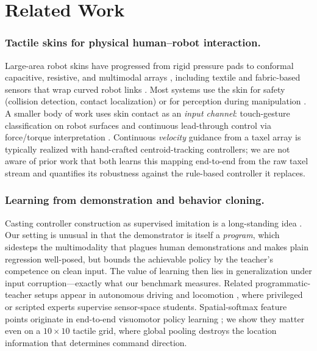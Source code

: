 \documentclass[runningheads]{llncs}
\begin{document}
\section{Related Work}
\label{sec:related}

\subsubsection{Tactile skins for physical human--robot interaction.}
Large-area robot skins have progressed from rigid pressure pads to
conformal capacitive, resistive, and multimodal arrays
\cite{dahiya2010tactile,cannata2008embedded,mittendorfer2011humanoid},
including textile and fabric-based sensors that wrap curved robot links
\cite{robosweater,luo2021conformal,tamura2020woven}.  Most systems use the
skin for safety (collision detection, contact localization) or for
perception during manipulation \cite{yuan2017gelsight,luo2025tactileroboticsoutlook}.
A smaller body of work uses skin contact as an \emph{input channel}:
touch-gesture classification on robot surfaces
\cite{liu2022machine,fitter2016qualitative} and continuous lead-through
control via force/torque interpretation \cite{Iskandar2024ScienceRobotics}.
Continuous \emph{velocity} guidance from a taxel array is typically
realized with hand-crafted centroid-tracking controllers; we are not aware
of prior work that both learns this mapping end-to-end from the raw taxel
stream and quantifies its robustness against the rule-based controller it
replaces.

\subsubsection{Learning from demonstration and behavior cloning.}
Casting controller construction as supervised imitation is a long-standing
idea \cite{pomerleau1989alvinn,argall2009survey}.  Our setting is unusual
in that the demonstrator is itself a \emph{program}, which sidesteps the
multimodality that plagues human demonstrations \cite{ross2011dagger} and
makes plain regression well-posed, but bounds the achievable policy by the
teacher's competence on clean input.  The value of learning then lies in
generalization under input corruption---exactly what our benchmark
measures.  Related programmatic-teacher setups appear in autonomous
driving \cite{chen2020learning} and locomotion \cite{lee2020learning},
where privileged or scripted experts supervise sensor-space students.
Spatial-softmax feature points originate in end-to-end visuomotor policy
learning \cite{levine2016end,finn2016deep}; we show they matter even on a
$10\times10$ tactile grid, where global pooling destroys the location
information that determines command direction.
\end{document}
